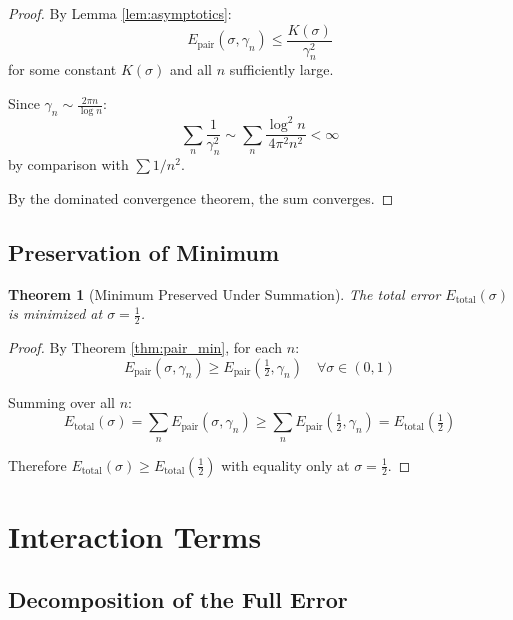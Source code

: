\documentclass[12pt,a4paper]{article}
\newtheorem{theorem}{Theorem}[section]
\theoremstyle{definition}
\theoremstyle{remark}
\newcommand{\Epair}{E_{\text{pair}}}
\newcommand{\Etotal}{E_{\text{total}}}
\newcommand{\half}{\tfrac{1}{2}}
\begin{document}
\begin{proof}
By Lemma \ref{lem:asymptotics}:
\begin{equation}
\Epair(\sigma, \gamma_n) \leq \frac{K(\sigma)}{\gamma_n^2}
\end{equation}
for some constant $K(\sigma)$ and all $n$ sufficiently large.

Since $\gamma_n \sim \frac{2\pi n}{\log n}$:
\begin{equation}
\sum_n \frac{1}{\gamma_n^2} \sim \sum_n \frac{\log^2 n}{4\pi^2 n^2} < \infty
\end{equation}
by comparison with $\sum 1/n^2$.

By the dominated convergence theorem, the sum converges.
\end{proof}

\subsection{Preservation of Minimum}

\begin{theorem}[Minimum Preserved Under Summation]
\label{thm:minimum_preserved}
The total error $\Etotal(\sigma)$ is minimized at $\sigma = \frac{1}{2}$.
\end{theorem}

\begin{proof}
By Theorem \ref{thm:pair_min}, for each $n$:
\begin{equation}
\Epair(\sigma, \gamma_n) \geq \Epair(\half, \gamma_n) \quad \forall \sigma \in (0,1)
\end{equation}

Summing over all $n$:
\begin{equation}
\Etotal(\sigma) = \sum_n \Epair(\sigma, \gamma_n) \geq \sum_n \Epair(\half, \gamma_n) = \Etotal(\half)
\end{equation}

Therefore $\Etotal(\sigma) \geq \Etotal(\half)$ with equality only at $\sigma = \half$.
\end{proof}

\section{Interaction Terms}
\label{sec:interactions}

\subsection{Decomposition of the Full Error}
\end{document}
